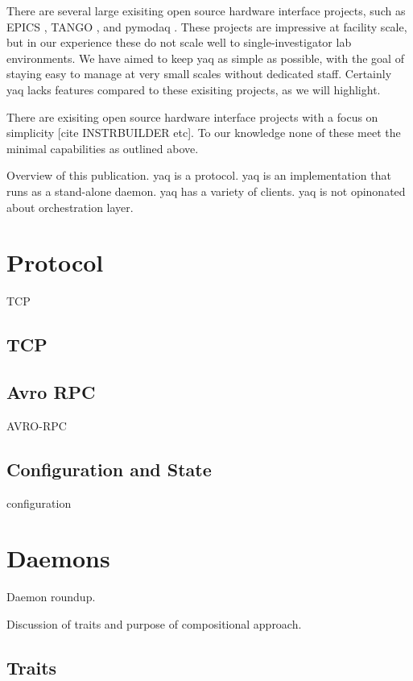 \documentclass{article}
\begin{document}
There are several large exisiting open source hardware interface projects, such as EPICS \cite{DalesioLR1991a}, TANGO \cite{tango-controls.org}, and pymodaq \cite{WeberSebastien2021a}.
These projects are impressive at facility scale, but in our experience these do not scale well to single-investigator lab environments.
We have aimed to keep yaq as simple as possible, with the goal of staying easy to manage at very small scales without dedicated staff.
Certainly yaq lacks features compared to these exisiting projects, as we will highlight.

There are exisiting open source hardware interface projects with a focus on simplicity [cite INSTRBUILDER etc].
To our knowledge none of these meet the minimal capabilities as outlined above.

Overview of this publication.
yaq is a protocol.
yaq is an implementation that runs as a stand-alone daemon.
yaq has a variety of clients.
yaq is not opinonated about orchestration layer.

\section{Protocol}

TCP

\subsection{TCP}

\subsection{Avro RPC}

AVRO-RPC

\subsection{Configuration and State}

configuration

\section{Daemons}

Daemon roundup.

Discussion of traits and purpose of compositional approach.

\subsection{Traits}
\end{document}
